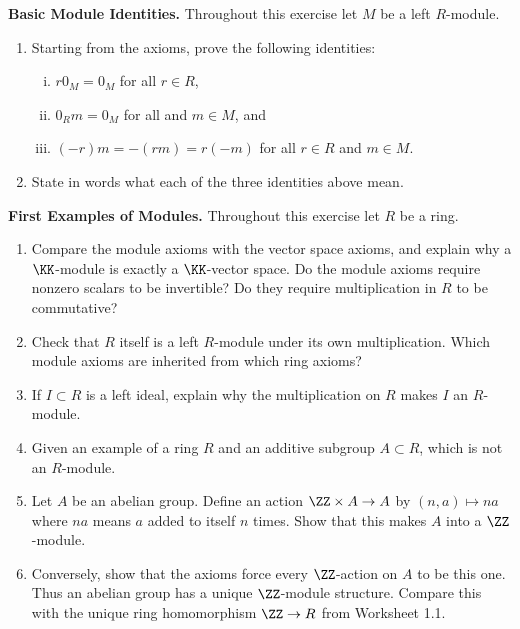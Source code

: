\documentclass[12pt,reqno]{amsart}
\begin{document}
\begin{problems}
\item\label{m:basic} \textbf{Basic Module Identities.} Throughout this exercise let $M$ be a left $R$-module.
\begin{enumerate}
\item Starting from the axioms, prove the following identities:
\begin{enumerate}[(i)]
	\item $r0_M=0_M$ for all $r \in R$, 
	\item $0_Rm=0_M$ for all and $m\in M$, and
	\item $(-r)m = -(rm) = r(-m)$ for all $r \in R$ and $m \in M$.
\end{enumerate}
\item State in words what each of the three identities above mean.
\end{enumerate}
\end{problems}

\begin{problems}
\item\label{m:examples} \textbf{First Examples of Modules.} Throughout this exercise let $R$ be a ring.
\begin{enumerate}
\item Compare the module axioms with the vector space axioms, and explain why a $\KK$-module is exactly a $\KK$-vector space. Do the module axioms require nonzero scalars to be invertible? Do they require multiplication in $R$ to be commutative?
\item Check that $R$ itself is a left $R$-module under its own multiplication. Which module axioms are inherited from which ring axioms?
\item  If $I\subset R$ is a left ideal, explain why the multiplication on $R$ makes $I$ an $R$-module.
\item Given an example of a ring $R$ and an additive subgroup $A \subset R$, which is not an $R$-module. 
\item Let $A$ be an abelian group. Define an action $\ZZ\times A \to A$ by $(n,a) \mapsto na$ where $na$ means $a$ added to itself $n$ times. Show that this makes $A$ into a $\ZZ$-module. 
\item Conversely, show that the axioms force every $\ZZ$-action on $A$ to be this one. Thus an abelian group has a unique $\ZZ$-module structure. Compare this with the unique ring homomorphism $\ZZ\to R$ from Worksheet 1.1.
\end{enumerate}
\end{problems}
\end{document}
